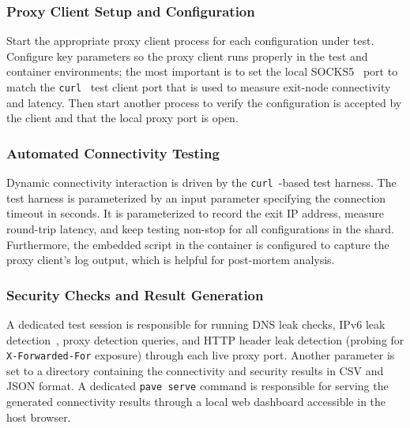 \documentclass[10pt,conference]{IEEEtran}
\begin{document}
\subsubsection{Proxy Client Setup and Configuration}
Start the appropriate proxy client process for each configuration under test.
Configure key parameters so the proxy client runs properly in the test and container environments; the most important is to set the local SOCKS5~\cite{rfc1928} port to match the \texttt{curl}~\cite{curl} test client port that is used to measure exit-node connectivity and latency.
Then start another process to verify the configuration is accepted by the client and that the local proxy port is open.

\subsubsection{Automated Connectivity Testing}
Dynamic connectivity interaction is driven by the \texttt{curl}~\cite{curl}-based test harness.
The test harness is parameterized by an input parameter specifying the connection timeout in seconds.
It is parameterized to record the exit IP address, measure round-trip latency, and keep testing non-stop for all configurations in the shard.
Furthermore, the embedded script in the container is configured to capture the proxy client's log output, which is helpful for post-mortem analysis.

\subsubsection{Security Checks and Result Generation}
A dedicated test session is responsible for running DNS leak checks, IPv6 leak detection~\cite{vpn_survey2023}, proxy detection queries, and HTTP header leak detection (probing for \texttt{X-Forwarded-For} exposure) through each live proxy port.
Another parameter is set to a directory containing the connectivity and security results in CSV and JSON format.
A dedicated \texttt{pave serve} command is responsible for serving the generated connectivity results through a local web dashboard accessible in the host browser.
\end{document}
